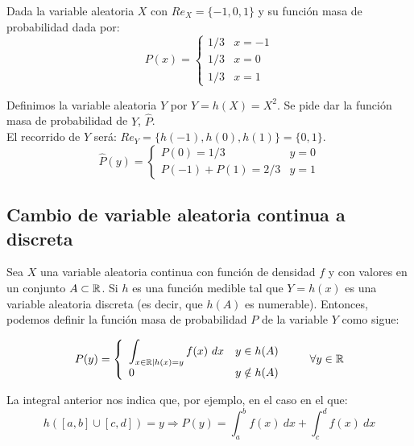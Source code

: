 \begin{ejemplo}
    Dada la variable aleatoria $X$ con $Re_X = \{-1, 0, 1\}$ y su función masa de probabilidad dada por:
    $$P(x) = \left\{ \begin{array}{cl}
        1/3 & x = -1 \\
        1/3 & x = 0  \\
        1/3 & x = 1
    \end{array} \right.$$
    
    
    Definimos la variable aleatoria $Y$ por $Y=h(X)=X^2$. Se pide dar la función masa de probabilidad de $Y$, $\hat{P}$.\\
    
    El recorrido de $Y$ será: $Re_Y = \{h(-1), h(0), h(1)\} = \{0, 1\}$.
    $$\hat{P}(y) = \left\{ \begin{array}{ll}
        P(0) = 1/3         & y = 0 \\
        P(-1) + P(1) = 2/3 & y = 1
      \end{array} \right.$$
\end{ejemplo}

\subsection{Cambio de variable aleatoria continua a discreta}

Sea $X$ una variable aleatoria continua con función de densidad $f$ y con valores en un conjunto $A \subset \mathbb R$.
Si $h$ es una función medible tal que $Y=h(x)$ es una variable aleatoria discreta (es decir, que $h(A)$ es numerable).
Entonces, podemos definir la función masa de probabilidad $P$ de la variable $Y$ como sigue:

$$P(y) = \left\{ \begin{array}{ll}
    \displaystyle \int_{x \in \mathbb R \mid h(x) = y} f(x)~dx & y \in h(A)    \\
    0                                     & y \notin h(A)
\end{array} \right. \qquad \forall y \in \mathbb R$$

\bigskip

La integral anterior nos indica que, por ejemplo, en el caso en el que:
$$h([a,b] \cup [c,d]) = y \Rightarrow P(y) = \int_a^b f(x)~dx + \int_c^d f(x)~dx$$

